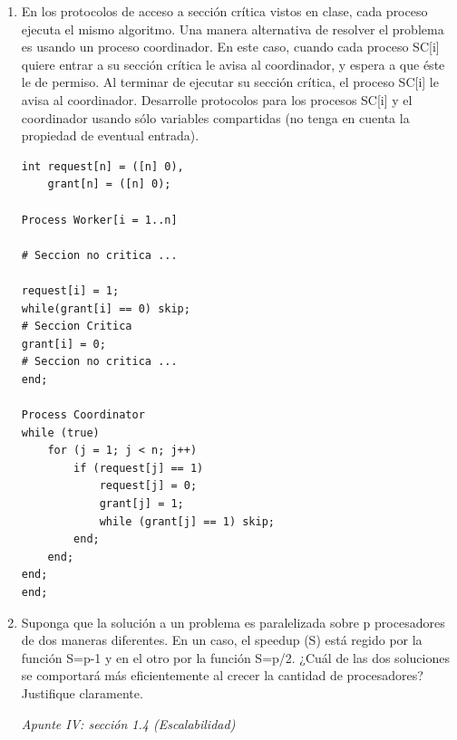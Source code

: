\documentclass[a4paper, 10pt]{article}
\newenvironment{QandA}{
    \begin{enumerate}\bfseries}
    {\end{enumerate}
}
\newenvironment{answered}{\par\normalfont}{}
\begin{document}
\begin{QandA}
\begin{enumerate}
\begin{answered}
\end{answered}

\item Indique que mecanismo de pasaje de mensajes utilizaría. Justifique.

\begin{answered}
En mi opinión, utilizaría PMA. Particularmente, porque su primitiva \lstinline{send} no es bloqueante. Esto nos evita demoras innecesarias al momento de propagar el valor de un proceso, en particular con $n$ muy grandes.    
\end{answered}


\end{enumerate}


\item En los protocolos de acceso a sección crítica vistos en clase, cada proceso ejecuta el mismo algoritmo. Una manera alternativa de resolver el problema es usando un proceso coordinador. En este caso, cuando cada
proceso SC[i] quiere entrar a su sección crítica le avisa al coordinador, y espera a que éste le de permiso. Al
terminar de ejecutar su sección crítica, el proceso SC[i] le avisa al coordinador.
Desarrolle protocolos para los procesos SC[i] y el coordinador usando sólo variables compartidas (no
tenga en cuenta la propiedad de eventual entrada).

\begin{lstlisting}[multicols=2]
int request[n] = ([n] 0),
    grant[n] = ([n] 0);

Process Worker[i = 1..n]
    
# Seccion no critica ...

request[i] = 1;
while(grant[i] == 0) skip;
# Seccion Critica
grant[i] = 0;
# Seccion no critica ...
end;

Process Coordinator
while (true)
    for (j = 1; j < n; j++)
        if (request[j] == 1)
            request[j] = 0;
            grant[j] = 1;
            while (grant[j] == 1) skip;
        end;
    end;
end;
end;
\end{lstlisting}


\item Suponga que la solución a un problema es paralelizada sobre p procesadores de dos maneras diferentes.
En un caso, el speedup (S) está regido por la función S=p-1 y en el otro por la función S=p/2. ¿Cuál de las
dos soluciones se comportará más eficientemente al crecer la cantidad de procesadores? Justifique
claramente.
\begin{answered}
    \emph{Apunte IV: sección 1.4 (Escalabilidad)}
\end{answered}


\end{QandA}
\end{document}
